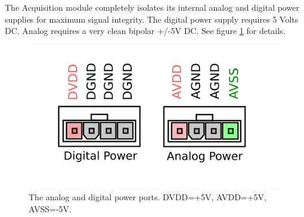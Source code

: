 The Acquisition module completely isolates its internal analog and
digital power supplies for maximum signal integrity. The digital power
supply requires 5 Volts DC. Analog requires a very clean bipolar +/-5V
DC. See figure \ref{power} for details. 

\begin{figure}[h!]
\centering
\includegraphics[scale=1.0]{enclosure.back.power.svg}
\caption{The analog and digital power ports. DVDD=+5V, AVDD=+5V, AVSS=-5V. }
\label{power}
\end{figure}
